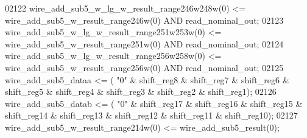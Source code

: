 \begin{DoxyCode}
{02122     \textcolor{vhdlchar}{wire_add_sub5_w_lg_w_result_range246w248w}\textcolor{vhdlchar}{(}\textcolor{vhdllogic}{}\textcolor{vhdllogic}{0}\textcolor{vhdlchar}{)} \textcolor{vhdlchar}{<=} \textcolor{vhdlchar}{
      wire_add_sub5_w_result_range246w}\textcolor{vhdlchar}{(}\textcolor{vhdllogic}{}\textcolor{vhdllogic}{0}\textcolor{vhdlchar}{)} \textcolor{keywordflow}{AND} \textcolor{vhdlchar}{read_nominal_out};
02123     \textcolor{vhdlchar}{wire_add_sub5_w_lg_w_result_range251w253w}\textcolor{vhdlchar}{(}\textcolor{vhdllogic}{}\textcolor{vhdllogic}{0}\textcolor{vhdlchar}{)} \textcolor{vhdlchar}{<=} \textcolor{vhdlchar}{
      wire_add_sub5_w_result_range251w}\textcolor{vhdlchar}{(}\textcolor{vhdllogic}{}\textcolor{vhdllogic}{0}\textcolor{vhdlchar}{)} \textcolor{keywordflow}{AND} \textcolor{vhdlchar}{read_nominal_out};
02124     \textcolor{vhdlchar}{wire_add_sub5_w_lg_w_result_range256w258w}\textcolor{vhdlchar}{(}\textcolor{vhdllogic}{}\textcolor{vhdllogic}{0}\textcolor{vhdlchar}{)} \textcolor{vhdlchar}{<=} \textcolor{vhdlchar}{
      wire_add_sub5_w_result_range256w}\textcolor{vhdlchar}{(}\textcolor{vhdllogic}{}\textcolor{vhdllogic}{0}\textcolor{vhdlchar}{)} \textcolor{keywordflow}{AND} \textcolor{vhdlchar}{read_nominal_out};
02125     \textcolor{vhdlchar}{wire_add_sub5_dataa} \textcolor{vhdlchar}{<=} \textcolor{vhdlchar}{(} \textcolor{vhdllogic}{"0"} \textcolor{vhdlchar}{&} \textcolor{vhdlchar}{shift_reg8} \textcolor{vhdlchar}{&} \textcolor{vhdlchar}{shift_reg7} \textcolor{vhdlchar}{&} \textcolor{vhdlchar}{shift_reg6} \textcolor{vhdlchar}{&} \textcolor{vhdlchar}{
      shift_reg5} \textcolor{vhdlchar}{&} \textcolor{vhdlchar}{shift_reg4} \textcolor{vhdlchar}{&} \textcolor{vhdlchar}{shift_reg3} \textcolor{vhdlchar}{&} \textcolor{vhdlchar}{shift_reg2} \textcolor{vhdlchar}{&} \textcolor{vhdlchar}{shift_reg1}\textcolor{vhdlchar}{)};
02126     \textcolor{vhdlchar}{wire_add_sub5_datab} \textcolor{vhdlchar}{<=} \textcolor{vhdlchar}{(} \textcolor{vhdllogic}{"0"} \textcolor{vhdlchar}{&} \textcolor{vhdlchar}{shift_reg17} \textcolor{vhdlchar}{&} \textcolor{vhdlchar}{shift_reg16} \textcolor{vhdlchar}{&} \textcolor{vhdlchar}{shift_reg15} \textcolor{vhdlchar}{&} \textcolor{vhdlchar}{
      shift_reg14} \textcolor{vhdlchar}{&} \textcolor{vhdlchar}{shift_reg13} \textcolor{vhdlchar}{&} \textcolor{vhdlchar}{shift_reg12} \textcolor{vhdlchar}{&} \textcolor{vhdlchar}{shift_reg11} \textcolor{vhdlchar}{&} \textcolor{vhdlchar}{shift_reg10}\textcolor{vhdlchar}{)};
02127     \textcolor{vhdlchar}{wire_add_sub5_w_result_range214w}\textcolor{vhdlchar}{(}\textcolor{vhdllogic}{}\textcolor{vhdllogic}{0}\textcolor{vhdlchar}{)} \textcolor{vhdlchar}{<=} \textcolor{vhdlchar}{wire_add_sub5_result}\textcolor{vhdlchar}{(}\textcolor{vhdllogic}{}\textcolor{vhdllogic}{0}\textcolor{vhdlchar}{)};
}
\end{DoxyCode}
